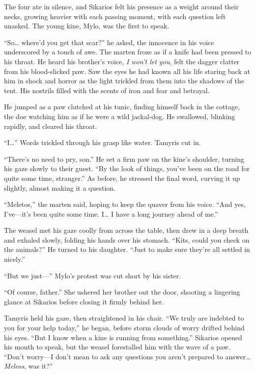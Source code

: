 The four ate in silence, and Sikarios felt his presence as a weight around their necks, growing heavier with each passing moment, with each question left unasked. The young kine, Mylo, was the first to speak.

``So\ldots{} where'd you get that scar?'' he asked, the innocence in his voice underscored by a touch of awe. The marten froze as if a knife had been pressed to his throat. He heard his brother's voice, \emph{I won't let you}, felt the dagger clatter from his blood-slicked paw. Saw the eyes he had known all his life staring back at him in shock and horror as the light trickled from them into the shadows of the tent. His nostrils filled with the scents of iron and fear and betrayal.

He jumped as a paw clutched at his tunic, finding himself back in the cottage, the doe watching him as if he were a wild jackal-dog. He swallowed, blinking rapidly, and cleared his throat.

``I\ldots'' Words trickled through his grasp like water. Tamyris cut in.

``There's no need to pry, son.'' He set a firm paw on the kine's shoulder, turning his gaze slowly to their guest. ``By the look of things, you've been on the road for quite some time, stranger.'' As before, he stressed the final word, curving it up slightly, almost making it a question.

``Meletos,'' the marten said, hoping to keep the quaver from his voice. ``And yes, I've---it's been quite some time. I\ldots{} I have a long journey ahead of me.''

The weasel met his gaze coolly from across the table, then drew in a deep breath and exhaled slowly, folding his hands over his stomach. ``Kits, could you check on the animals?'' He turned to his daughter. ``Just to make sure they're all settled in nicely.''

``But we just---'' Mylo's protest was cut short by his sister.

``Of course, father.'' She ushered her brother out the door, shooting a lingering glance at Sikarios before closing it firmly behind her.

Tamyris held his gaze, then straightened in his chair. ``We truly are indebted to you for your help today,'' he began, before storm clouds of worry drifted behind his eyes. ``But I know when a kine is running from something.'' Sikarios opened his mouth to speak, but the weasel forestalled him with the wave of a paw. ``Don't worry---I don't mean to ask any questions you aren't prepared to answer\ldots{} \emph{Meleos}, was it?''


